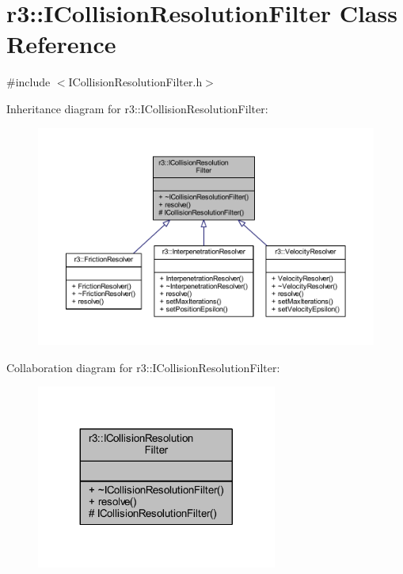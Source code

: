 \hypertarget{classr3_1_1_i_collision_resolution_filter}{}\section{r3\+:\+:I\+Collision\+Resolution\+Filter Class Reference}
\label{classr3_1_1_i_collision_resolution_filter}


{\ttfamily \#include $<$I\+Collision\+Resolution\+Filter.\+h$>$}



Inheritance diagram for r3\+:\+:I\+Collision\+Resolution\+Filter\+:\nopagebreak
\begin{figure}[H]
\begin{center}
\leavevmode
\includegraphics[width=350pt]{classr3_1_1_i_collision_resolution_filter__inherit__graph}
\end{center}
\end{figure}


Collaboration diagram for r3\+:\+:I\+Collision\+Resolution\+Filter\+:\nopagebreak
\begin{figure}[H]
\begin{center}
\leavevmode
\includegraphics[width=224pt]{classr3_1_1_i_collision_resolution_filter__coll__graph}
\end{center}
\end{figure}
